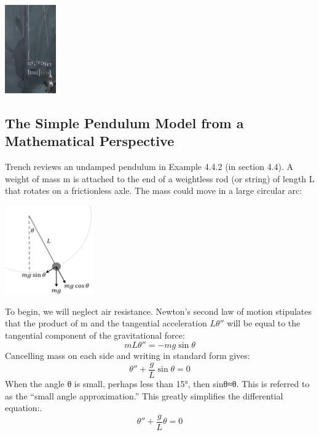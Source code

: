 \documentclass{ximera}
\begin{document}
\begin{image}
 \includegraphics[height=1.5in]{pendulumLock.jpg}
\end{image}

\subsection*{The Simple Pendulum Model from a Mathematical Perspective}

Trench reviews an undamped pendulum in Example 4.4.2 (in section 4.4).  A weight of mass m is attached to the end of a weightless rod (or string) of length L that rotates on a frictionless axle.  The mass could move in a large circular arc:

\begin{image}
 \includegraphics[height=1.5in]{pendulumswing.jpg}
\end{image}

To begin, we will neglect air resistance.  Newton’s second law of motion stipulates that the product of m and the tangential acceleration $L\theta''$ will be equal to the tangential component of the gravitational force:
$$mL\theta''=-mg \sin\theta $$
Cancelling mass on each side and writing in standard form gives:
$$\theta ''+\frac{g}{L} \sin\theta=0$$
When the angle θ is small, perhaps less than 15°, then sin⁡θ≈θ.  This is referred to as the “small angle approximation.”  This greatly simplifies the differential equation:.
\begin{equation}\label{eq:simplePend1}\theta''+\frac{g}{L}\theta=0\end{equation}
\end{document}
